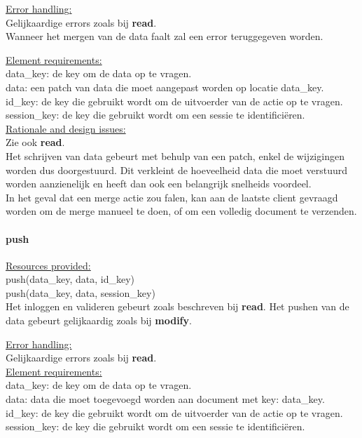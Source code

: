 \documentclass[a4paper,10pt]{article}
\begin{document}
\underline{Error handling:}\\
Gelijkaardige errors zoals bij \textbf{read}.\\
Wanneer het mergen van de data faalt zal een error teruggegeven worden.

\underline{Element requirements:}\\
data\_key: de key om de data op te vragen.\\
data: een patch van data die moet aangepast worden op locatie data\_key.\\ 
id\_key: de key die gebruikt wordt om de uitvoerder van de actie op te vragen.\\
session\_key: de key die gebruikt wordt om een sessie te identifici\"{e}ren.\\

\underline{Rationale and design issues:}\\
Zie ook \textbf{read}.\\
Het schrijven van data gebeurt met behulp van een patch, enkel de wijzigingen worden dus doorgestuurd.  Dit verkleint de hoeveelheid data die moet verstuurd worden aanzienelijk en heeft dan ook een belangrijk snelheids voordeel.\\
In het geval dat een merge actie zou falen, kan aan de laatste client gevraagd worden om de merge manueel te doen, of om een volledig document te verzenden.

\paragraph{push}
\underline{Resources provided:}\\
push(data\_key, data, id\_key)\\
push(data\_key, data, session\_key)\\
Het inloggen en valideren gebeurt zoals beschreven bij \textbf{read}.
Het pushen van de data gebeurt gelijkaardig zoals bij \textbf{modify}.

\underline{Error handling:}\\
Gelijkaardige errors zoals bij \textbf{read}.\\

\underline{Element requirements:}\\
data\_key: de key om de data op te vragen.\\
data: data die moet toegevoegd worden aan document met key: data\_key.\\
id\_key: de key die gebruikt wordt om de uitvoerder van de actie op te vragen.\\
session\_key: de key die gebruikt wordt om een sessie te identifici\"{e}ren.\\
\end{document}

